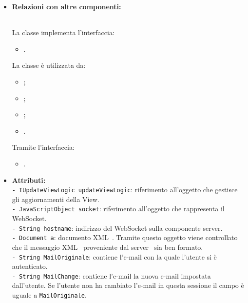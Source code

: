 {{\begin{sloppypar}
{{\begin{itemize}
				\item[] \textbf{Relazioni con altre componenti:}{\\
					La classe implementa l'interfaccia:
					\begin{itemize}
						\item {}.
					\end{itemize}
						La classe è utilizzata da:
					\begin{itemize}
						\item[] ;
						\item[] ;
						\item[] ;
						\item[] .
					\end{itemize}
					Tramite l'interfaccia:
					\begin{itemize}
						\item {}.\\
					\end{itemize}
				}
				
				\item[] \textbf{Attributi:}{\\
					\texttt{- IUpdateViewLogic updateViewLogic}: riferimento all'oggetto che gestisce gli aggiornamenti della View.\\
					
					\texttt{- JavaScriptObject socket}: riferimento all'oggetto che rappresenta il WebSocket.\\
					
					\texttt{- String hostname}: indirizzo del WebSocket sulla componente server\g.\\
					
					\texttt{- Document a}: documento XML\g~. Tramite questo oggetto viene controllato che il messaggio XML\g~ proveniente dal server\g~ sia ben formato.\\
					
					\texttt{- String MailOriginale}: contiene l'e-mail con la quale l'utente si è autenticato.\\
					
					\texttt{- String MailChange}: contiene l'e-mail la nuova e-mail impostata dall'utente. Se l'utente non ha cambiato l'e-mail in questa sessione il campo è uguale a \texttt{MailOriginale}.\\
					
}
\end{itemize}}}
\end{sloppypar}}}
